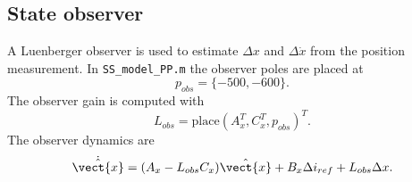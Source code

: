 \subsection{State observer}

A Luenberger observer is used to estimate $\Delta x$ and $\Delta \dot{x}$ from the position measurement. In \texttt{SS\_model\_PP.m} the observer poles are placed at
\begin{equation}
    p_{obs} = \{-500, -600\}.
\end{equation}
The observer gain is computed with
\begin{equation}
    L_{obs} = \mathrm{place}(A_x^T, C_x^T, p_{obs})^T.
\end{equation}
The observer dynamics are
\begin{equation}
    \dot{\hat{\vect{x}}} = (A_x - L_{obs} C_x)\hat{\vect{x}} + B_x \Delta i_{ref} + L_{obs} \Delta x.
\end{equation}
